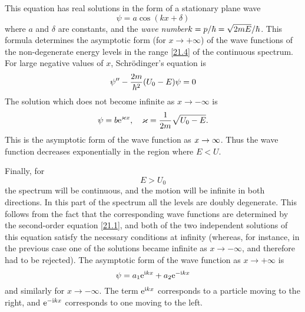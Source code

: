 This equation has real solutions in the form of a stationary plane wave
\begin{equation}\label{21.5}
\psi=a\cos(kx+\delta)
\end{equation}
where $ a $ and $ \delta $ are constants, and the \textit{wave number}$ k=p/\hbar=\sqrt{2mE}/\hbar $. This formula determines the asymptotic form (for $ x\to+\infty $) of the wave functions of the non-degenerate energy levels in the range \eqref{21.4} of the continuous spectrum. For large negative values of $ x $, Schr\"odinger's equation is
\[ \psi''-\frac{2m}{\hbar^2}(U_0-E)\psi=0 \]
The solution which does not become infinite as $ x \to-\infty $ is
\begin{equation}\label{21.6}
\psi=b\mathrm{e}^{\varkappa x},\quad\varkappa=\frac{1}{2m}\sqrt{U_0-E}.
\end{equation}
This is the asymptotic form of the wave function as $ x\to\-\infty $. Thus the wave function decreases exponentially in the region where $ E < U $.

Finally, for
\begin{equation}\label{21.7}
E>U_0
\end{equation}
the spectrum will be continuous, and the motion will be infinite in both directions. In this part of the spectrum all the levels are doubly degenerate. This follows from the fact that the corresponding wave functions are determined by the second-order equation \eqref{21.1}, and both of the two independent solutions of this equation satisfy the necessary conditions at infinity (whereas, for instance, in the previous case one of the solutions became infinite as $ x\to-\infty $, and therefore had to be rejected). The asymptotic form of the wave function as $ x\to+\infty $ is
\begin{equation}\label{21.8}
\psi=a_1\mathrm{e}^{\mathrm{i} kx}+a_2\mathrm{e}^{-\mathrm{i} kx}
\end{equation}
and similarly for $ x\to-\infty $. The term $ \mathrm{e}^{\mathrm{i} kx} $ corresponds to a particle moving to the right, and $ \mathrm{e}^{-\mathrm{i} kx} $ corresponds to one moving to the left.

